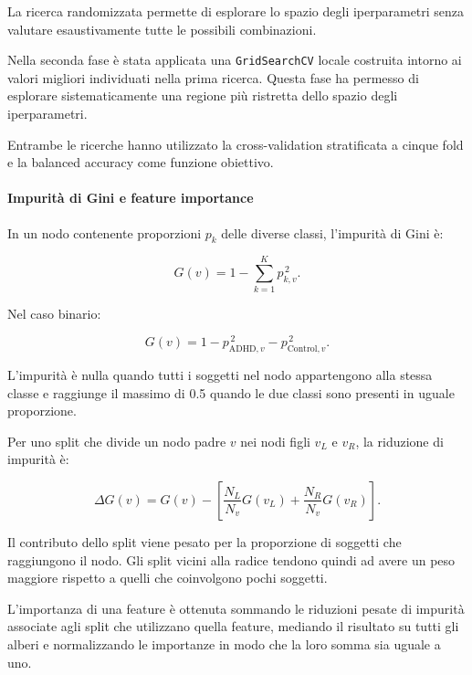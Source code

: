 La ricerca randomizzata permette di esplorare lo spazio degli
iperparametri senza valutare esaustivamente tutte le possibili
combinazioni.

Nella seconda fase è stata applicata una
\texttt{GridSearchCV} locale costruita intorno ai valori migliori
individuati nella prima ricerca. Questa fase ha permesso di esplorare
sistematicamente una regione più ristretta dello spazio degli
iperparametri.

Entrambe le ricerche hanno utilizzato la cross-validation
stratificata a cinque fold e la balanced accuracy come funzione
obiettivo.


\paragraph{Impurità di Gini e feature importance}

In un nodo contenente proporzioni $p_k$ delle diverse classi,
l'impurità di Gini è:

\begin{equation}
	G(v)
	=
	1-\sum_{k=1}^{K}p_{k,v}^{\,2}.
\end{equation}

Nel caso binario:

\begin{equation}
	G(v)
	=
	1
	-
	p_{\mathrm{ADHD},v}^{\,2}
	-
	p_{\mathrm{Control},v}^{\,2}.
\end{equation}

L'impurità è nulla quando tutti i soggetti nel nodo appartengono alla
stessa classe e raggiunge il massimo di 0.5 quando le due classi sono
presenti in uguale proporzione.

Per uno split che divide un nodo padre $v$ nei nodi figli $v_L$ e
$v_R$, la riduzione di impurità è:

\begin{equation}
	\Delta G(v)
	=
	G(v)
	-
	\left[
	\frac{N_L}{N_v}G(v_L)
	+
	\frac{N_R}{N_v}G(v_R)
	\right].
\end{equation}

Il contributo dello split viene pesato per la proporzione di soggetti
che raggiungono il nodo. Gli split vicini alla radice tendono quindi
ad avere un peso maggiore rispetto a quelli che coinvolgono pochi
soggetti.

L'importanza di una feature è ottenuta sommando le riduzioni pesate di
impurità associate agli split che utilizzano quella feature, mediando
il risultato su tutti gli alberi e normalizzando le importanze in modo
che la loro somma sia uguale a uno.

